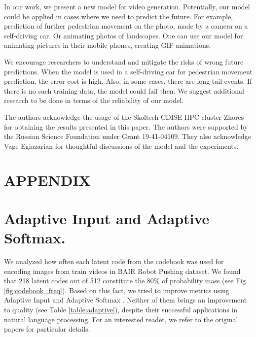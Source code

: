 \documentclass{article}
\begin{document}
In our work, we present a new model for video generation. Potentially, our model could be applied in cases where we need to predict the future. For example, prediction of further pedestrian movement on the photo, made by a camera on a self-driving car. Or animating photos of landscapes. One can use our model for animating pictures in their mobile phones, creating GIF animations.

We encourage researchers to understand and mitigate the risks of wrong future predictions. When the model is used in a self-driving car for pedestrian movement prediction, the error cost is high. Also, in some cases, there are long-tail events. If there is no such training data, the model could fail then. We suggest additional research to be done in terms of the reliability of our model. \begin{ack}
The authors acknowledge the usage of the Skoltech CDISE HPC cluster Zhores for obtaining the results presented in this paper. The authors were supported by the Russian Science Foundation under Grant 19-41-04109. They also acknowledge Vage Egiazarian for thoughtful discussions of the model and the experiments.
\end{ack} 
\medskip

\small




\newpage
\appendix

\section*{\uppercase{Appendix}}

\section{Adaptive Input and Adaptive Softmax.}

We analyzed how often each latent code from the codebook was used for encoding images from train videos in BAIR Robot Pushing dataset. We found that 218 latent codes out of 512 constitute the 80\% of probability mass (see Fig. \ref{fig:codebook_freq}). Based on this fact, we tried to improve metrics using Adaptive Input \cite{adaptive_input} and Adaptive Softmax \cite{adaptive_softmax}. Neither of them brings an improvement to quality (see Table \ref{table:adaptive}), despite their successful applications in natural language processing. For an interested reader, we refer to the original papers for particular details.
\end{document}
